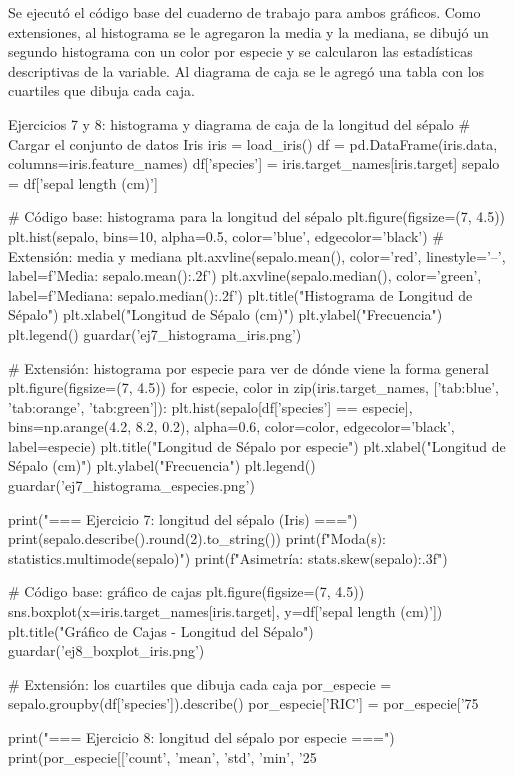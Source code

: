 \documentclass[11pt,letterpaper]{article}
\begin{document}
Se ejecutó el código base del cuaderno de trabajo para ambos gráficos. Como extensiones, al histograma se le agregaron la media y la mediana, se dibujó un segundo histograma con un color por especie y se calcularon las estadísticas descriptivas de la variable. Al diagrama de caja se le agregó una tabla con los cuartiles que dibuja cada caja.

\begin{codigo}[label=cod:ej78]{Ejercicios 7 y 8: histograma y diagrama de caja de la longitud del sépalo}
# Cargar el conjunto de datos Iris
iris = load_iris()
df = pd.DataFrame(iris.data, columns=iris.feature_names)
df['species'] = iris.target_names[iris.target]
sepalo = df['sepal length (cm)']

# Código base: histograma para la longitud del sépalo
plt.figure(figsize=(7, 4.5))
plt.hist(sepalo, bins=10, alpha=0.5, color='blue', edgecolor='black')
# Extensión: media y mediana
plt.axvline(sepalo.mean(), color='red', linestyle='--', label=f'Media: {sepalo.mean():.2f}')
plt.axvline(sepalo.median(), color='green', label=f'Mediana: {sepalo.median():.2f}')
plt.title("Histograma de Longitud de Sépalo")
plt.xlabel("Longitud de Sépalo (cm)")
plt.ylabel("Frecuencia")
plt.legend()
guardar('ej7_histograma_iris.png')

# Extensión: histograma por especie para ver de dónde viene la forma general
plt.figure(figsize=(7, 4.5))
for especie, color in zip(iris.target_names, ['tab:blue', 'tab:orange', 'tab:green']):
    plt.hist(sepalo[df['species'] == especie], bins=np.arange(4.2, 8.2, 0.2),
             alpha=0.6, color=color, edgecolor='black', label=especie)
plt.title("Longitud de Sépalo por especie")
plt.xlabel("Longitud de Sépalo (cm)")
plt.ylabel("Frecuencia")
plt.legend()
guardar('ej7_histograma_especies.png')

print("\n=== Ejercicio 7: longitud del sépalo (Iris) ===")
print(sepalo.describe().round(2).to_string())
print(f"Moda(s): {statistics.multimode(sepalo)}")
print(f"Asimetría: {stats.skew(sepalo):.3f}")

# Código base: gráfico de cajas
plt.figure(figsize=(7, 4.5))
sns.boxplot(x=iris.target_names[iris.target], y=df['sepal length (cm)'])
plt.title("Gráfico de Cajas - Longitud del Sépalo")
guardar('ej8_boxplot_iris.png')

# Extensión: los cuartiles que dibuja cada caja
por_especie = sepalo.groupby(df['species']).describe()
por_especie['RIC'] = por_especie['75%

print("\n=== Ejercicio 8: longitud del sépalo por especie ===")
print(por_especie[['count', 'mean', 'std', 'min', '25%
\end{codigo}
\end{document}
